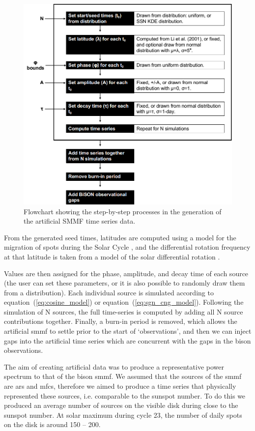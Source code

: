 \begin{figure}[ht!]
	\centering
	\includegraphics[width=0.85\columnwidth]{flow_chart_2.png}
	\caption{Flowchart showing the step-by-step processes in the generation of the artificial SMMF time series data.}
	\label{fig:flowchart}
\end{figure}


From the generated seed times, latitudes are computed using a model for the migration of spots during the Solar Cycle \citep{li_latitude_2001-1}, and the differential rotation frequency at that latitude is taken from a model of the solar differential rotation \citep{snodgrass_magnetic_1983}. 

Values are then assigned for the phase, amplitude, and decay time of each source (the user can set these parameters, or it is also possible to randomly draw them from a distribution). Each individual source is simulated according to equation~(\ref{eq:cosine_model}) or equation~(\ref{eq:sgn_cng_model}). Following the simulation of N sources, the full time-series is computed by adding all N source contributions together. Finally, a burn-in period is removed, which allows the artificial \gls{smmf} to settle prior to the start of `observations', and then we can inject gaps into the artificial time series which are concurrent with the gaps in the \gls{bison} observations.

The aim of creating artificial data was to produce a representative power spectrum to that of the \gls{bison} \gls{smmf}. We assumed that the sources of the \gls{smmf} are \gls{ar}s and \gls{mfc}s, therefore we aimed to produce a time series that physically represented these sources, i.e. comparable to the sunspot number. To do this we produced an average number of sources on the visible disk during close to the sunspot number. At solar maximum during cycle 23, the number of daily spots on the disk is around 150 -- 200. 

